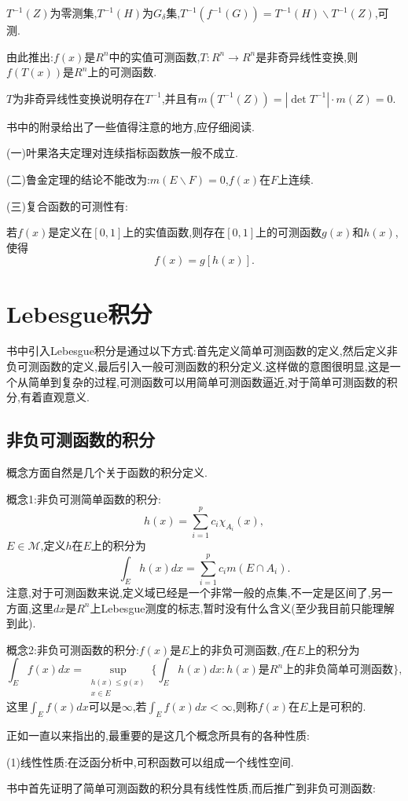\documentclass[12pt,a4paper,openany]{book}
\begin{document}
$T^{-1}(Z)$为零测集,$T^{-1}(H)$为$G_{\delta}$集,$T^{-1}{(f^{-1}(G))}=T^{-1}(H) \backslash T^{-1}(Z)$,可测.

由此推出:$f(x)$是$R^n$中的实值可测函数,$T:R^n \rightarrow R^n$是非奇异线性变换,则$f(T(x))$是$R^n$上的可测函数.

$T$为非奇异线性变换说明存在$T^{-1}$,并且有$m(T^{-1}(Z)) = |\det{T}^{-1}| \cdot m(Z)=0$.

书中的附录给出了一些值得注意的地方,应仔细阅读.

(一)叶果洛夫定理对连续指标函数族一般不成立.

(二)鲁金定理的结论不能改为:$m(E \backslash F)=0$,$f(x)$在$F$上连续.

(三)复合函数的可测性有:

若$f(x)$是定义在$[0,1]$上的实值函数,则存在$[0,1]$上的可测函数$g(x)$和$h(x)$,使得
\[
f(x) = g[h(x)].
\]

\chapter{Lebesgue积分}
书中引入Lebesgue积分是通过以下方式:首先定义简单可测函数的定义,然后定义非负可测函数的定义,最后引入一般可测函数的积分定义.这样做的意图很明显,这是一个从简单到复杂的过程,可测函数可以用简单可测函数逼近,对于简单可测函数的积分,有着直观意义.

\section{非负可测函数的积分}
概念方面自然是几个关于函数的积分定义.

概念1:非负可测简单函数的积分:
\[
h(x)=\sum_{i=1}^{p}{c_i\chi_{A_i}{(x)}},
\]
$E \in \mathcal{M}$,定义$h$在$E$上的积分为
\[
\int_{E}{h(x)dx} = \sum_{i=1}^{p}{c_im(E \cap A_i)}.
\]
注意,对于可测函数来说,定义域已经是一个非常一般的点集,不一定是区间了,另一方面,这里$dx$是$R^n$上Lebesgue测度的标志,暂时没有什么含义(至少我目前只能理解到此).

概念2:非负可测函数的积分:$f(x)$是$E$上的非负可测函数,$f$在$E$上的积分为
\[
\int_{E}{f(x)dx}=\sup_{\substack{h(x) \le g(x) \\ x\in E}}\{\int_{E}{h(x)dx}:h(x)\text{是}R^n\text{上的非负简单可测函数}\},
\]
这里$\int_{E}{f(x)dx}$可以是$\infty$,若$\int_{E}{f(x)dx}<\infty$,则称$f(x)$在$E$上是可积的.

正如一直以来指出的,最重要的是这几个概念所具有的各种性质:

(1)线性性质:在泛函分析中,可积函数可以组成一个线性空间.

书中首先证明了简单可测函数的积分具有线性性质,而后推广到非负可测函数:
\end{document}
